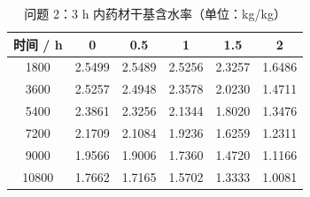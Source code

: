 \begin{table}[htbp]
\centering
\caption{问题 2：3 h 内药材干基含水率（单位：kg/kg）}
\label{table_04_p2_moisture}
\begin{tabular}{cccccc}
\toprule
时间 / h & 0 & 0.5 & 1 & 1.5 & 2 \\
\midrule
1800 & 2.5499 & 2.5489 & 2.5256 & 2.3257 & 1.6486 \\
3600 & 2.5257 & 2.4948 & 2.3578 & 2.0230 & 1.4711 \\
5400 & 2.3861 & 2.3256 & 2.1344 & 1.8020 & 1.3476 \\
7200 & 2.1709 & 2.1084 & 1.9236 & 1.6259 & 1.2311 \\
9000 & 1.9566 & 1.9006 & 1.7360 & 1.4720 & 1.1166 \\
10800 & 1.7662 & 1.7165 & 1.5702 & 1.3333 & 1.0081 \\
\bottomrule
\end{tabular}
\end{table}

